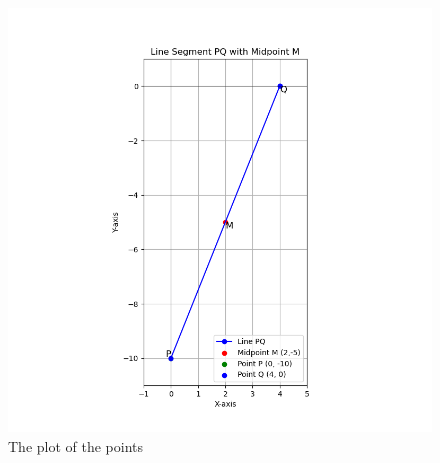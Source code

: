 \documentclass[journal]{IEEEtran}
\numberwithin{equation}{enumi}
\numberwithin{figure}{enumi}
\begin{document}
\begin{figure}[ht!]
  \hspace{-3cm}
  \includegraphics[width=1.5\textwidth]{Figure_1.png}
  
  \caption{The plot of the points }
  \label{fig:your_label}
\end{figure}
\end{document}
